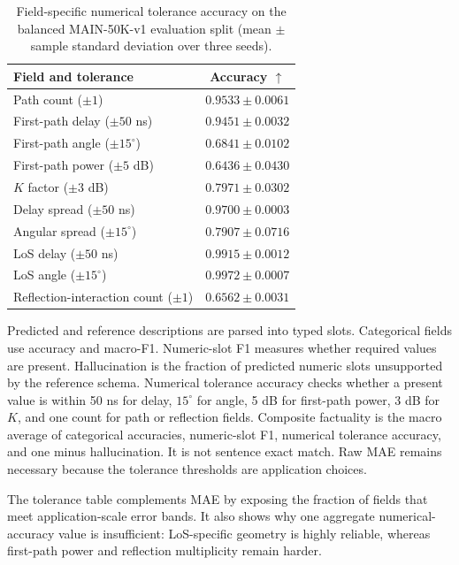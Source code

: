 \begin{table}[t]
\centering
\caption{Field-specific numerical tolerance accuracy on the balanced MAIN-50K-v1 evaluation split
(mean $\pm$ sample standard deviation over three seeds).}
\label{tab:field-tolerance-complete}
\scriptsize
\setlength{\tabcolsep}{3pt}
\begin{tabular}{lc}
\toprule
Field and tolerance & Accuracy $\uparrow$ \\
\midrule
Path count ($\pm1$) & $0.9533\pm0.0061$ \\
First-path delay ($\pm50$ ns) & $0.9451\pm0.0032$ \\
First-path angle ($\pm15^\circ$) & $0.6841\pm0.0102$ \\
First-path power ($\pm5$ dB) & $0.6436\pm0.0430$ \\
$K$ factor ($\pm3$ dB) & $0.7971\pm0.0302$ \\
Delay spread ($\pm50$ ns) & $0.9700\pm0.0003$ \\
Angular spread ($\pm15^\circ$) & $0.7907\pm0.0716$ \\
LoS delay ($\pm50$ ns) & $0.9915\pm0.0012$ \\
LoS angle ($\pm15^\circ$) & $0.9972\pm0.0007$ \\
Reflection-interaction count ($\pm1$) & $0.6562\pm0.0031$ \\
\bottomrule
\end{tabular}
\end{table}

Predicted and reference descriptions are parsed into typed slots. Categorical fields use accuracy and
macro-F1. Numeric-slot F1 measures whether required values are present. Hallucination is the fraction
of predicted numeric slots unsupported by the reference schema. Numerical tolerance accuracy checks
whether a present value is within 50 ns for delay, $15^\circ$ for angle, 5 dB for first-path power,
3 dB for $K$, and one count for path or reflection fields. Composite factuality is the macro average
of categorical accuracies, numeric-slot F1, numerical tolerance accuracy, and one minus hallucination.
It is not sentence exact match. Raw MAE remains necessary because the tolerance thresholds are
application choices.

The tolerance table complements MAE by exposing the fraction of fields that meet application-scale
error bands. It also shows why one aggregate numerical-accuracy value is insufficient: LoS-specific
geometry is highly reliable, whereas first-path power and reflection multiplicity remain harder.

